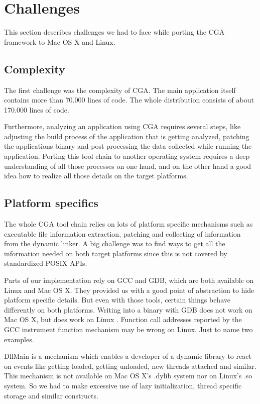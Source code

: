 
\section{Challenges} This section describes challenges we had to face while porting the CGA framework to Mac OS X and Linux.


\subsection{Complexity}

The first challenge was the complexity of CGA. The main application itself contains more than 70.000 lines of code. The whole distribution consists of about 170.000 lines of code.

Furthermore, analyzing an application using CGA requires several steps, like adjusting the build process of the application that is getting analyzed, patching the applications binary and post processing the data collected while running the application. Porting this tool chain to another operating system requires a deep understanding of all those processes on one hand, and on the other hand a good idea how to realize all those details on the target platforms.

\subsection{Platform specifics}

The whole CGA tool chain relies on lots of platform specific mechanisms such as executable file information extraction, patching and collecting of information from the dynamic linker. A big challenge was to find ways to get all the information needed on both target platforms since this is not covered by standardized POSIX APIs.

Parts of our implementation rely on GCC and GDB, which are both available on Linux and Mac OS X. They provided us with a good point of abstraction to hide platform specific details. But even with those tools, certain things behave differently on both platforms. Writing into a binary with GDB does not work on Mac OS X, but does work on Linux . Function call addresses reported by the GCC instrument function mechanism may be wrong on Linux.  Just to name two examples.

DllMain is a mechanism which enables a developer of a dynamic library to react on events like getting loaded, getting unloaded, new threads attached and similar. This mechanism is not available on Mac OS X's .dylib system nor on Linux's .so system.  So we had to make excessive use of lazy initialization, thread specific storage and similar constructs.

